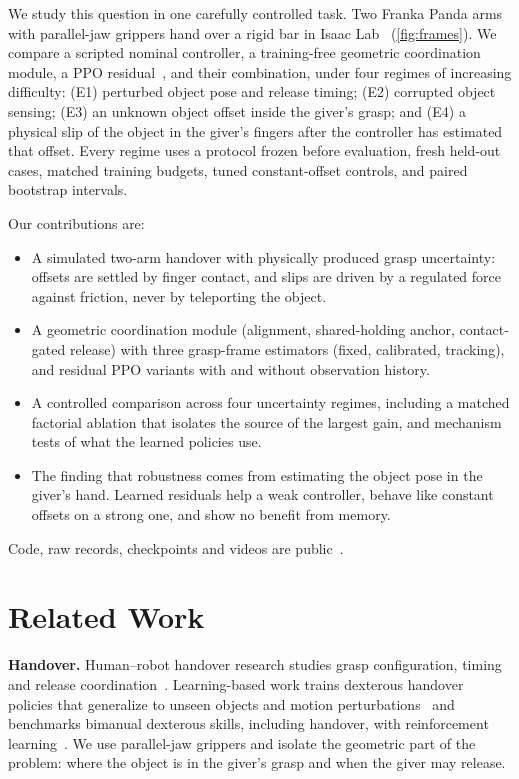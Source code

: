 \documentclass[conference,letterpaper]{IEEEtran}
\begin{document}
We study this question in one carefully controlled task. Two Franka Panda arms with parallel-jaw grippers hand over
a rigid bar in Isaac Lab~\cite{mittal2025isaaclab} (\cref{fig:frames}). We compare a scripted nominal controller,
a training-free geometric coordination module, a PPO residual~\cite{schulman2017ppo}, and their combination, under
four regimes of increasing difficulty: (E1) perturbed object pose and release timing; (E2) corrupted object sensing;
(E3) an unknown object offset inside the giver's grasp; and (E4) a physical slip of the object in the giver's
fingers after the controller has estimated that offset. Every regime uses a protocol frozen before evaluation,
fresh held-out cases, matched training budgets, tuned constant-offset controls, and paired bootstrap intervals.

Our contributions are:
\begin{itemize}
\item A simulated two-arm handover with physically produced grasp uncertainty: offsets are settled by finger
contact, and slips are driven by a regulated force against friction, never by teleporting the object.
\item A geometric coordination module (alignment, shared-holding anchor, contact-gated release) with three
grasp-frame estimators (fixed, calibrated, tracking), and residual PPO variants with and without observation history.
\item A controlled comparison across four uncertainty regimes, including a matched factorial ablation that isolates
the source of the largest gain, and mechanism tests of what the learned policies use.
\item The finding that robustness comes from estimating the object pose in the giver's hand. Learned residuals help
a weak controller, behave like constant offsets on a strong one, and show no benefit from memory.
\end{itemize}
Code, raw records, checkpoints and videos are public~\cite{repo2026}.



\section{Related Work}

\textbf{Handover.} Human--robot handover research studies grasp configuration, timing and release
coordination~\cite{ortenzi2021handover,strabala2013handover}. Learning-based work trains dexterous handover policies
that generalize to unseen objects and motion perturbations~\cite{frau2025handover} and benchmarks bimanual
dexterous skills, including handover, with reinforcement learning~\cite{chen2022bidexhands}. We use parallel-jaw
grippers and isolate the geometric part of the problem: where the object is in the giver's grasp and when the giver
may release.
\end{document}
